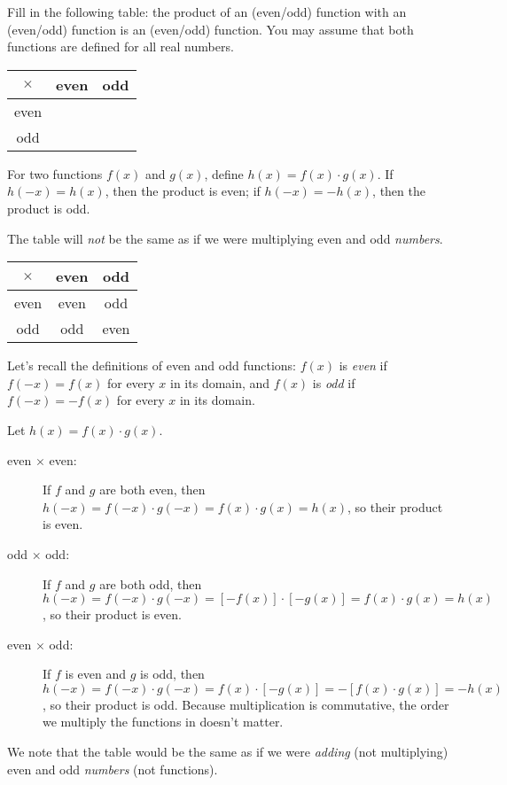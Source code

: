 \begin{Mquestion}

Fill in the following table: the product of an (even/odd) function with an (even/odd) function is an (even/odd) function. You may assume that both functions are defined for all real numbers.

\begin{center}
\begin{tabular}{|c||c|c|}
\hline
$\times$&even&odd\\
\hline\hline
even&&\\
\hline
odd&&\\
\hline
\end{tabular}\end{center}
\end{Mquestion}
\begin{hint}
For two functions $f(x)$ and $g(x)$, define $h(x)=f(x)\cdot g(x)$. If $h(-x)=h(x)$, then the product is even; if $h(-x)=-h(x)$, then the product is odd.

The table will \emph{not} be  the same as if we were multiplying even and odd \emph{numbers}.
\end{hint}
\begin{answer}

\begin{tabular}{|c||c|c|}
\hline
$\times$&even&odd\\
\hline\hline
even&even&odd\\
\hline
odd&odd&even\\
\hline
\end{tabular}

\end{answer}
\begin{solution}
Let's recall the definitions of even and odd functions: $f(x)$ is \emph{even} if $f(-x)=f(x)$ for every $x$ in its domain, and $f(x)$ is \emph{odd} if $f(-x)=-f(x)$ for every $x$ in its domain.

Let $h(x)=f(x)\cdot g(x)$.
\begin{description}
\item[even $\times$ even: ] If $f$ and $g$ are both even, then $h(-x)=f(-x)\cdot g(-x) = f(x)\cdot g(x)=h(x)$, so their product is even.
\item[odd $\times$ odd: ] If $f$ and $g$ are both odd, then $h(-x)=f(-x)\cdot g(-x) =[- f(x)]\cdot [-g(x)]=f(x)\cdot g(x)=h(x)$, so their product is even.
\item[even $\times$ odd: ] If $f$ is even and $g$ is odd, then $h(-x)=f(-x)\cdot g(-x) = f(x)\cdot[- g(x)]=-[f(x)\cdot g(x)]=-h(x)$, so their product is odd. Because multiplication is commutative, the order we multiply the functions in doesn't matter.
\end{description}

We note that the table would be the same as if we were \emph{adding} (not multiplying) even and odd \emph{numbers} (not functions).
\end{solution}

